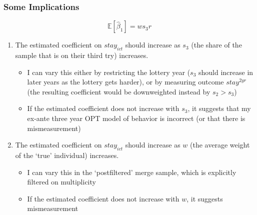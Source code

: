 \documentclass[xcolor=dvipsnames, compress, 12pt, aspectratio=169, handout]{beamer}
\begin{document}
\begin{frame}
    \frametitle{Some Implications}
    \begin{equation}
        \mathbb{E}[\hat{\beta}_1] = w s_3 r
    \end{equation}
    \begin{enumerate}
        \item The estimated coefficient on $stay_{ict}$ should increase as $s_3$ (the share of the sample that is on their third try) increases.
        \begin{itemize}
            \item I can vary this either by restricting the lottery year ($s_3$ should increase in later years as the lottery gets harder), or by measuring outcome $stay^{2yr}$ (the resulting coefficient would be downweighted instead by $s_2 > s_3$)
            \item If the estimated coefficient does not increase with $s_3$, it suggests that my ex-ante three year OPT model of behavior is incorrect (or that there is mismeasurement)
        \end{itemize}
        \item The estimated coefficient on $stay_{ict}$ should increase as $w$ (the average weight of the `true' individual) increases.
        \begin{itemize}
            \item I can vary this in the `postfiltered' merge sample, which is explicitly filtered on multiplicity
            \item If the estimated coefficient does not increase with $w$, it suggests mismeasurement
        \end{itemize}
    \end{enumerate}
\end{frame}
\end{document}
